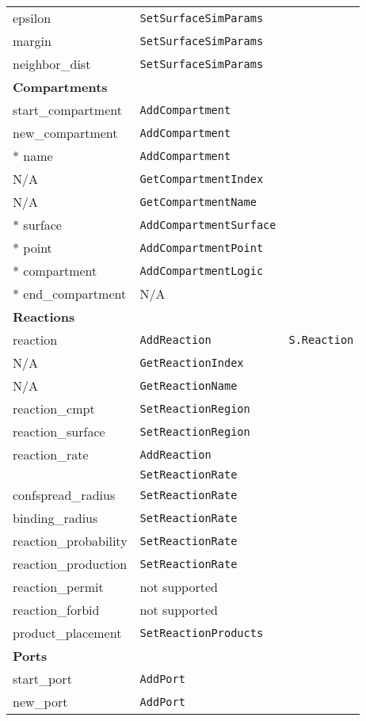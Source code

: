 \documentclass {book}
\newcommand {\ttt} {\texttt}
\begin{document}
\begin{longtable}[c]{lll}
epsilon & \ttt{SetSurfaceSimParams}\\
margin & \ttt{SetSurfaceSimParams}\\
neighbor\_dist & \ttt{SetSurfaceSimParams}\\
\hline
\multicolumn{3}{l}{\hspace{0.3in}\textbf{Compartments}}\\
\hline
start\_compartment & \ttt{AddCompartment}\\
new\_compartment & \ttt{AddCompartment}\\
{*} name & \ttt{AddCompartment}\\
N/A & \ttt{GetCompartmentIndex}\\
N/A & \ttt{GetCompartmentName}\\
{*} surface & \ttt{AddCompartmentSurface}\\
{*} point & \ttt{AddCompartmentPoint}\\
{*} compartment & \ttt{AddCompartmentLogic}\\
{*} end\_compartment & N/A\\
\hline
\multicolumn{3}{l}{\hspace{0.3in}\textbf{Reactions}}\\
\hline
reaction & \ttt{AddReaction} & \ttt{S.Reaction} \\
N/A & \ttt{GetReactionIndex}\\
N/A & \ttt{GetReactionName}\\
reaction\_cmpt & \ttt{SetReactionRegion}\\
reaction\_surface & \ttt{SetReactionRegion}\\
reaction\_rate & \ttt{AddReaction}\\
& \ttt{SetReactionRate}\\
confspread\_radius & \ttt{SetReactionRate}\\
binding\_radius & \ttt{SetReactionRate}\\
reaction\_probability & \ttt{SetReactionRate}\\
reaction\_production & \ttt{SetReactionRate}\\
reaction\_permit & not supported\\
reaction\_forbid & not supported\\
product\_placement & \ttt{SetReactionProducts}\\
\hline
\multicolumn{3}{l}{\hspace{0.3in}\textbf{Ports}}\\
\hline
start\_port & \ttt{AddPort}\\
new\_port & \ttt{AddPort}\\

\end{longtable}
\end{document}
